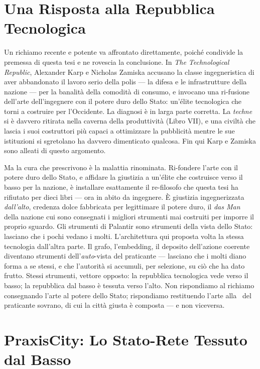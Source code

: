 \section*{Una Risposta alla Repubblica Tecnologica}

Un richiamo recente e potente va affrontato direttamente, poich\'e condivide la
premessa di questa tesi e ne rovescia la conclusione. In \emph{The Technological
Republic}, Alexander Karp e Nicholas Zamiska accusano la classe ingegneristica di
aver abbandonato il lavoro serio della polis --- la difesa e le infrastrutture
della nazione --- per la banalit\`a della comodit\`a di consumo, e invocano una
ri-fusione dell'arte dell'ingegnere con il potere duro dello Stato: un'\'elite
tecnologica che torni a costruire per l'Occidente. La diagnosi \`e in larga parte
corretta. La \emph{techne} si \`e davvero ritirata nella caverna della
produttivit\`a (Libro VII), e una civilt\`a che lascia i suoi costruttori pi\`u
capaci a ottimizzare la pubblicit\`a mentre le sue istituzioni si sgretolano ha
davvero dimenticato qualcosa. Fin qui Karp e Zamiska sono alleati di questo
argomento.

Ma la cura che prescrivono \`e la malattia rinominata. Ri-fondere l'arte con il
potere duro dello Stato, e affidare la giustizia a un'\'elite che costruisce verso
il basso per la nazione, \`e installare esattamente il re-filosofo che questa tesi
ha rifiutato per dieci libri --- ora in abito da ingegnere. \`E giustizia
ingegnerizzata \emph{dall'alto}, credenza dolce fabbricata per legittimare il
potere duro, il \emph{das Man} della nazione cui sono consegnati i migliori
strumenti mai costruiti per imporre il proprio sguardo. Gli strumenti di Palantir
sono strumenti della vista dello Stato: lasciano che i pochi vedano i molti.
L'architettura qui proposta volta la stessa tecnologia dall'altra parte. Il grafo,
l'embedding, il deposito dell'azione coerente diventano strumenti dell'\emph{auto}-vista
del praticante --- lasciano che i molti diano forma a se stessi, e che l'autorit\`a
si accumuli, per selezione, su ci\`o che ha dato frutto. Stessi strumenti, vettore
opposto: la repubblica tecnologica vede verso il basso; la repubblica dal basso
\`e tessuta verso l'alto. Non rispondiamo al richiamo consegnando l'arte al potere
dello Stato; rispondiamo restituendo l'arte alla \physis\ del praticante sovrano,
di cui la citt\`a giusta \`e composta --- e non viceversa.

\section*{PraxisCity: Lo Stato-Rete Tessuto dal Basso}

